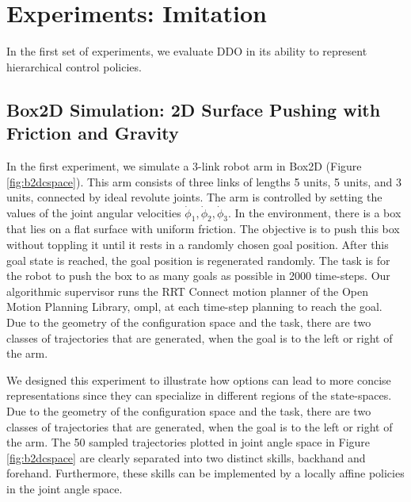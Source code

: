 \section{Experiments: Imitation}
In the first set of experiments, we evaluate DDO in its ability to represent hierarchical control policies. 

\subsection*{Box2D Simulation: 2D Surface Pushing with Friction and Gravity}
In the first experiment, we simulate a 3-link robot arm in Box2D (Figure \ref{fig:b2dcspace}). This arm consists of three links of lengths 5 units, 5 units, and 3 units, connected by ideal revolute joints. The arm is controlled by setting the values of the joint angular velocities $\dot{\phi}_1, \dot{\phi}_2, \dot{\phi}_3$. In the environment, there is a box that lies on a flat surface with uniform friction. The objective is to push this box without toppling it until it rests in a randomly chosen goal position. After this goal state is reached, the goal position is regenerated randomly.
The task is for the robot to push the box to as many goals as possible in 2000 time-steps.
Our algorithmic supervisor runs the RRT Connect motion planner of the Open Motion Planning Library, \textsf{ompl}, at each time-step planning to reach the goal. 
Due to the geometry of the configuration space and the task, there are two classes of trajectories that are generated, when the goal is to the left or right of the arm. 

We designed this experiment to illustrate how options can lead to more concise representations since they can specialize in different regions of the state-spaces.
Due to the geometry of the configuration space and the task, there are two classes of trajectories that are generated, when the goal is to the left or right of the arm.
The 50 sampled trajectories plotted in joint angle space in Figure \ref{fig:b2dcspace} are clearly separated into two distinct skills, backhand and forehand. 
Furthermore, these skills can be implemented by a locally affine policies in the joint angle space.

